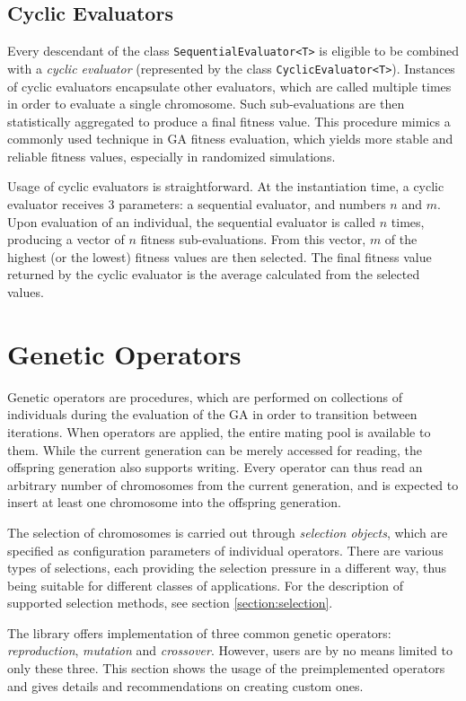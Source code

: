 \subsection{Cyclic Evaluators}
Every descendant of the class \texttt{SequentialEvaluator<T>} is eligible to be combined with a \textit{cyclic evaluator} (represented by the class \texttt{CyclicEvaluator<T>}). Instances of cyclic evaluators encapsulate other evaluators, which are called multiple times in order to evaluate a single chromosome. Such sub-evaluations are then statistically aggregated to produce a final fitness value. This procedure mimics a commonly used technique in GA fitness evaluation, which yields more stable and reliable fitness values, especially in randomized simulations.

Usage of cyclic evaluators is straightforward. At the instantiation time, a cyclic evaluator receives 3 parameters: a sequential evaluator, and numbers $n$ and $m$. Upon evaluation of an individual, the sequential evaluator is called $n$ times, producing a vector of $n$ fitness sub-evaluations. From this vector, $m$ of the highest (or the lowest) fitness values are then selected. The final fitness value returned by the cyclic evaluator is the average calculated from the selected values.

\section{Genetic Operators}\label{section:genetic-operators}
Genetic operators are procedures, which are performed on collections of individuals during the evaluation of the GA in order to transition between iterations. When operators are applied, the entire mating pool is available to them. While the current generation can be merely accessed for reading, the offspring generation also supports writing. Every operator can thus read an arbitrary number of chromosomes from the current generation, and is expected to insert at least one chromosome into the offspring generation.

The selection of chromosomes is carried out through \textit{selection objects}, which are specified as configuration parameters of individual operators. There are various types of selections, each providing the selection pressure in a different way, thus being suitable for different classes of applications. For the description of supported selection methods, see section \ref{section:selection}.

The library offers implementation of three common genetic operators: \textit{reproduction}, \textit{mutation} and \textit{crossover}. However, users are by no means limited to only these three. This section shows the usage of the preimplemented operators and gives details and recommendations on creating custom ones.

